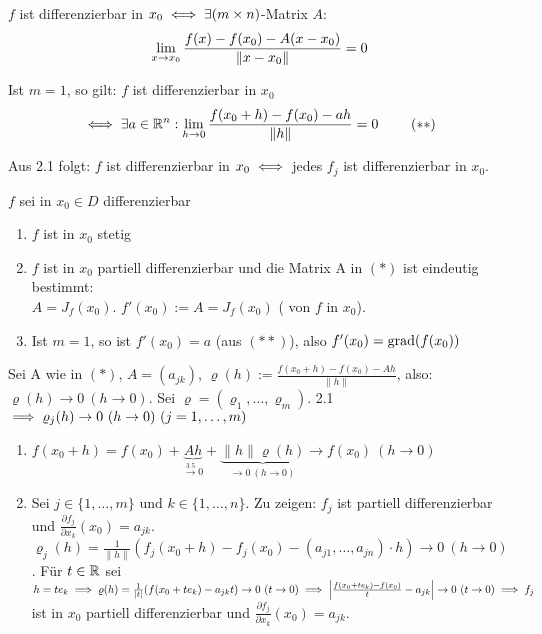 \documentclass[a4paper,oneside,DIV15,BCOR12mm,chapterprefix=true,headings=onelinechapter]{scrbook}
\begin{document}
\begin{bemerkungen}
    \item $f$ ist differenzierbar in 
          $x_0\iff\exists (m \times n)$-Matrix $A$:
          \[ \displaystyle\lim_{x\to x_0}\frac{f(x)-f(x_0)-A(x-x_0)}{\|x-x_0\|}=0 \]
    \item Ist $m=1$, so gilt: $f$ ist differenzierbar in $x_0$ 
        \begin{align*}
            \equizu \exists a \in\MdR^n:
            \ds\lim_{h\to 0}\frac{f(x_0+h)-f(x_0)-ah}{\|h\|}=0\ \tag{$**$}
        \end{align*}
    \item Aus 2.1 folgt: $f$ ist differenzierbar in $x_0\iff$ jedes $f_j$ ist differenzierbar in $x_0$.
\end{bemerkungen}

\begin{satz}
$f$ sei in $x_0\in D$ differenzierbar
\begin{enumerate}
\item $f$ ist in $x_0$ stetig
\item $f$ ist in $x_0$ partiell differenzierbar und die Matrix A in 
      $(*)$ ist eindeutig bestimmt: \\
      $A=J_f(x_0)$. $f'(x_0):=A=J_f(x_0)$ ( von $f$ in $x_0$).
\item Ist $m=1$, so ist $f'(x_0) = a$ (aus $(**)$), also $f'(x_0) = \mathop{\rm grad}\nolimits(f(x_0))$
\end{enumerate}
\end{satz}

\begin{beweis}
Sei A wie in $(*)$, $A=(a_{jk})$, $\varrho(h):=\frac{f(x_0+h)-f(x_0)-Ah}{\|h\|}$, also: $\varrho(h)\to0\ (h\to 0)$. Sei $\varrho=(\varrho_1,\ldots,\varrho_m)$. 2.1 $\folgt \varrho_j(h)\to 0\ (h\to 0)\ (j=1,\ldots,m)$
\begin{enumerate}
\item $f(x_0+h)=f(x_0)+\underbrace{Ah}_{\overset{\text{3.5}}{\to}0}+\underbrace{\|h\|\varrho(h)}_{\to 0\ (h\to 0)}\to f(x_0)\ (h\to 0)$
\item Sei $j\in\{1,\ldots,m\}$ und $k\in\{1,\ldots,n\}$. Zu zeigen: $f_j$ ist partiell differenzierbar und $\frac{\partial f_j}{\partial x_k}(x_0)=a_{jk}$. $\varrho_j(h)=\frac{1}{\|h\|}(f_j(x_0+h)-f_j(x_0)-(a_{j1},\ldots,a_{jn})\cdot h)\to 0\ (h \to 0)$. Für $t\in\mathbb{R}$ sei $h=te_k\folgt\varrho(h)=\frac{1}{|t|}(f(x_0+te_k)-a_{jk}t)\to 0\ (t\to 0)\folgt\left|\frac{f(x_0+te_k)-f(x_0)}{t}-a_{jk}\right|\to 0\ (t\to 0)\folgt f_j$ ist in $x_0$ partiell differenzierbar und $\frac{\partial f_j}{\partial x_k}(x_0)=a_{jk}$.
\end{enumerate}
\end{beweis}
\end{document}

